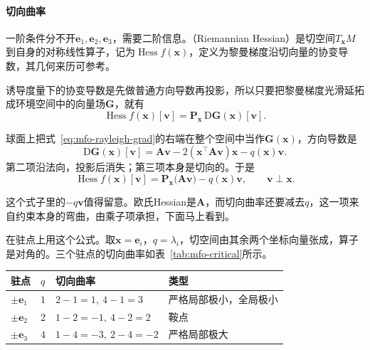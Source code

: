 \paragraph{切向曲率}
一阶条件分不开$\bm{e}_1,\bm{e}_2,\bm{e}_3$，需要二阶信息。（Riemannian Hessian）是切空间$T_{\bm{x}}M$到自身的对称线性算子，记为$\operatorname{Hess}f(\bm{x})$，定义为黎曼梯度沿切向量的协变导数，其几何来历可参考。

诱导度量下的协变导数是先做普通方向导数再投影，所以只要把黎曼梯度光滑延拓成环境空间中的向量场$\bm{G}$，就有
\begin{equation}
 \operatorname{Hess}f(\bm{x})[\bm{v}]=\bm{P}_{\bm{x}}\,\mathrm{D}\bm{G}(\bm{x})[\bm{v}].
 \label{eq:mfo-hess-projection}
\end{equation}

球面上把式~\eqref{eq:mfo-rayleigh-grad}的右端在整个空间中当作$\bm{G}(\bm{x})$，方向导数是
\[
 \mathrm{D}\bm{G}(\bm{x})[\bm{v}]=\bm{A}\bm{v}-2(\bm{x}^\top\bm{A}\bm{v})\bm{x}-q(\bm{x})\bm{v}.
\]
第二项沿法向，投影后消失；第三项本身是切向的。于是
\begin{equation}
 \operatorname{Hess}f(\bm{x})[\bm{v}]=\bm{P}_{\bm{x}}\bigl(\bm{A}\bm{v}\bigr)-q(\bm{x})\bm{v},\qquad \bm{v}\perp\bm{x}.
 \label{eq:mfo-rayleigh-hess}
\end{equation}

这个式子里的$-q\bm{v}$值得留意。欧氏Hessian是$\bm{A}$，而切向曲率还要减去$q$，这一项来自约束本身的弯曲，由乘子项承担，下面马上看到。

在驻点上用这个公式。取$\bm{x}=\bm{e}_i$，$q=\lambda_i$，切空间由其余两个坐标向量张成，算子是对角的。三个驻点的切向曲率如表~\ref{tab:mfo-critical}所示。

\begin{BookInlineTable}
 \centering
 \caption{贯穿例的驻点，切向曲率由式~\eqref{eq:mfo-rayleigh-hess}算出。}
 \label{tab:mfo-critical}
 \begin{tabular}{llll}
  \toprule
  驻点 & $q$ & 切向曲率 & 类型\\
  \midrule
  $\pm\bm{e}_1$ & $1$ & $2-1=1,\ 4-1=3$ & 严格局部极小，全局极小\\
  $\pm\bm{e}_2$ & $2$ & $1-2=-1,\ 4-2=2$ & 鞍点\\
  $\pm\bm{e}_3$ & $4$ & $1-4=-3,\ 2-4=-2$ & 严格局部极大\\
  \bottomrule
 \end{tabular}
\end{BookInlineTable}

